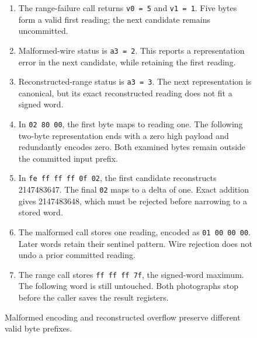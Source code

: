 \begin{figure}[htbp]
\begin{minipage}{\linewidth}
\begin{enumerate}
      \item The range-failure call returns \texttt{v0 = 5} and \texttt{v1 = 1}. Five bytes form a valid first reading; the next candidate remains uncommitted.
      \item Malformed-wire status is \texttt{a3 = 2}. This reports a representation error in the next candidate, while retaining the first reading.
      \item Reconstructed-range status is \texttt{a3 = 3}. The next representation is canonical, but its exact reconstructed reading does not fit a signed word.
      \item In \texttt{02 80 00}, the first byte maps to reading one. The following two-byte representation ends with a zero high payload and redundantly encodes zero. Both examined bytes remain outside the committed input prefix.
      \item In \texttt{fe ff ff ff 0f 02}, the first candidate reconstructs 2147483647. The final \texttt{02} maps to a delta of one. Exact addition gives 2147483648, which must be rejected before narrowing to a stored word.
      \item The malformed call stores one reading, encoded as \texttt{01 00 00 00}. Later words retain their sentinel pattern. Wire rejection does not undo a prior committed reading.
      \item The range call stores \texttt{ff ff ff 7f}, the signed-word maximum. The following word is still untouched. Both photographs stop before the caller saves the result registers.
    \end{enumerate}
  \end{minipage}
  \caption{Malformed encoding and reconstructed overflow preserve different valid byte prefixes.}
  \label{capture:023-delta-varint-f03}
  \label{delta-f03}
\end{figure}
\par
